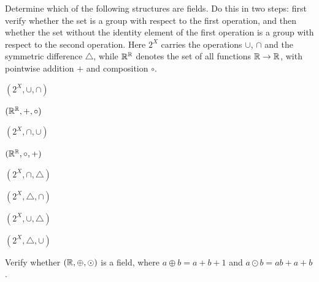 \begin{exercise}
Determine which of the following structures are fields. Do this in two steps: first verify whether the
set is a group with respect to the first operation, and then whether the set without the identity element
of the first operation is a group with respect to the second operation. Here $2^X$ carries the operations
$\cup$, $\cap$ and the symmetric difference $\bigtriangleup$, while $\mathbb{R}^{\mathbb{R}}$ denotes the set of all
functions $\mathbb{R}\to\mathbb{R}$, with pointwise addition $+$ and composition $\circ$.
\begin{enumerate*}[label=\alph*), itemjoin={\qquad}]
\item $(2^X, \cup, \cap)$
\item $(\mathbb{R}^{\mathbb{R}}, +, \circ)$
\item $(2^X, \cap, \cup)$
\item $(\mathbb{R}^{\mathbb{R}}, \circ, +)$
\item $(2^X, \cap, \bigtriangleup)$
\item $(2^X, \bigtriangleup, \cap)$
\item $(2^X, \cup, \bigtriangleup)$
\item $(2^X, \bigtriangleup, \cup)$
\end{enumerate*}
\end{exercise}

\begin{exercise}
Verify whether $(\mathbb{R}, \oplus, \odot)$ is a field, where $a \oplus b = a+b+1$ and $a\odot b = ab+a+b$.
\end{exercise}
